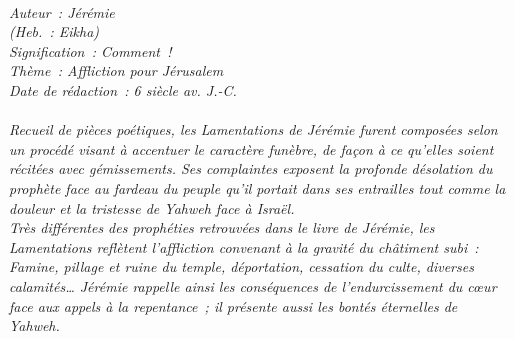 \BFont
\noindent\hrulefill
{\footnotesize
\textit{
\bigskip
{\centering{}
\\Auteur~: Jérémie
\\(Heb.~: Eikha)
\\Signification~: Comment~!
\\Thème~: Affliction pour Jérusalem
\\Date de rédaction~: 6 siècle av. J.-C.\\}
}
\textit{
\\Recueil de pièces poétiques, les Lamentations de Jérémie furent composées selon un procédé visant à accentuer le caractère funèbre, de façon à ce qu'elles soient récitées avec gémissements. Ses complaintes exposent la profonde désolation du prophète face au fardeau du peuple qu'il portait dans ses entrailles tout comme la douleur et la tristesse de Yahweh face à Israël.
\\Très différentes des prophéties retrouvées dans le livre de Jérémie, les Lamentations reflètent l'affliction convenant à la gravité du châtiment subi~: Famine, pillage et ruine du temple, déportation, cessation du culte, diverses calamités… Jérémie rappelle ainsi les conséquences de l'endurcissement du cœur face aux appels à la repentance~; il présente aussi les bontés éternelles de Yahweh.\bigskip
}
}
\par\nobreak\noindent\hrulefill
